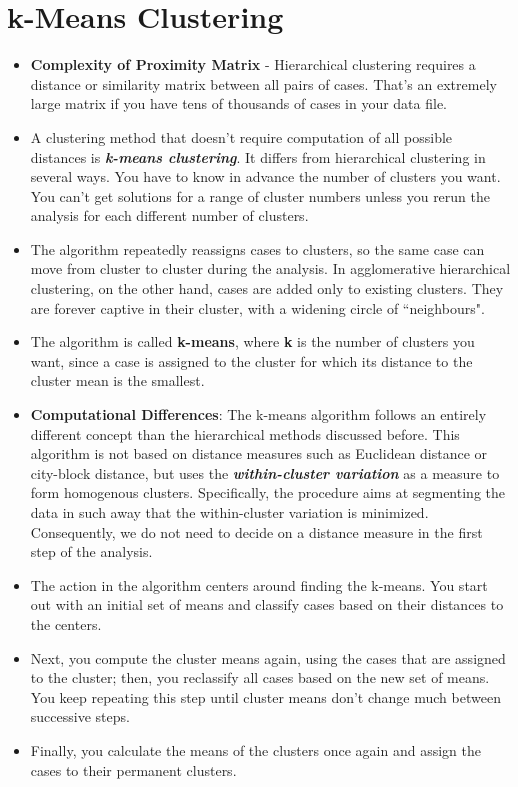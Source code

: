 \documentclass[SKLCluster.tex]{subfiles}
\begin{document}
\section{k-Means Clustering}
\begin{itemize}
\item \textbf{Complexity of Proximity Matrix} - Hierarchical clustering requires a distance or similarity matrix between all pairs of cases. That's an extremely large matrix if you have tens of thousands of cases in your data file.

\item A clustering method that doesn't require computation of all possible distances is \textbf{\textit{k-means clustering}}. It differs from hierarchical clustering in several ways. You have to know in advance the number of clusters you want. You can't get solutions for a range of cluster numbers unless you rerun the analysis for each different number of clusters.

\item The algorithm repeatedly reassigns cases to clusters, so the same case can move from cluster to cluster during the analysis. In agglomerative hierarchical clustering, on the other hand, cases are added only to existing clusters. They are forever captive in their cluster, with a widening circle of ``neighbours".

\item The algorithm is called \textbf{k-means}, where \textbf{k} is the number of clusters you want, since a case is assigned to the cluster for which its distance to the cluster mean is the smallest.

\item \textbf{Computational Differences}: The k-means algorithm follows an entirely different concept than the hierarchical methods
discussed before. This algorithm is not based on distance measures such as
Euclidean distance or city-block distance, but uses the \textbf{\textit{within-cluster variation}} as a measure to form homogenous clusters. Specifically, the procedure aims at segmenting
the data in such away that the within-cluster variation is minimized. Consequently, we
do not need to decide on a distance measure in the first step of the analysis.

\item The action in the algorithm centers around finding the k-means. You start out with an initial set of means and classify cases based on their distances to the centers.

\item Next, you compute the cluster means again, using the cases that are assigned to the cluster; then, you reclassify all cases based on the new set of means. You keep repeating this step until cluster means don't change much between successive steps.

\item Finally, you calculate the means of the clusters once again and assign the cases to their permanent clusters.
\end{itemize}
\end{document}
